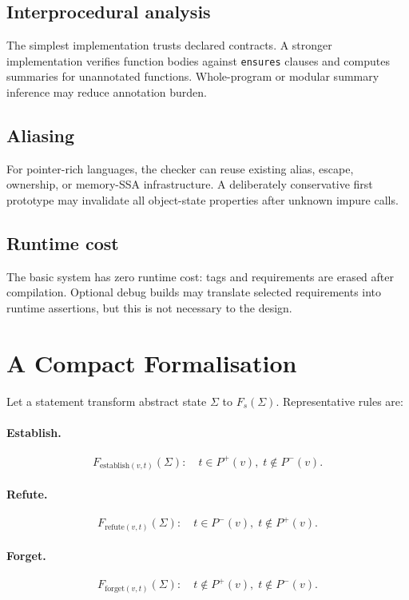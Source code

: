 \documentclass[11pt]{article}
\begin{document}
\subsection{Interprocedural analysis}
The simplest implementation trusts declared contracts. A stronger implementation verifies function bodies against \texttt{ensures} clauses and computes summaries for unannotated functions. Whole-program or modular summary inference may reduce annotation burden.

\subsection{Aliasing}
For pointer-rich languages, the checker can reuse existing alias, escape, ownership, or memory-SSA infrastructure. A deliberately conservative first prototype may invalidate all object-state properties after unknown impure calls.

\subsection{Runtime cost}
The basic system has zero runtime cost: tags and requirements are erased after compilation. Optional debug builds may translate selected requirements into runtime assertions, but this is not necessary to the design.

\section{A Compact Formalisation}
Let a statement transform abstract state $\Sigma$ to $F_s(\Sigma)$. Representative rules are:

\paragraph{Establish.}
\[
F_{\mathrm{establish}(v,t)}(\Sigma):
\quad t \in P^+(v),\; t \notin P^-(v).
\]

\paragraph{Refute.}
\[
F_{\mathrm{refute}(v,t)}(\Sigma):
\quad t \in P^-(v),\; t \notin P^+(v).
\]

\paragraph{Forget.}
\[
F_{\mathrm{forget}(v,t)}(\Sigma):
\quad t \notin P^+(v),\; t \notin P^-(v).
\]
\end{document}
